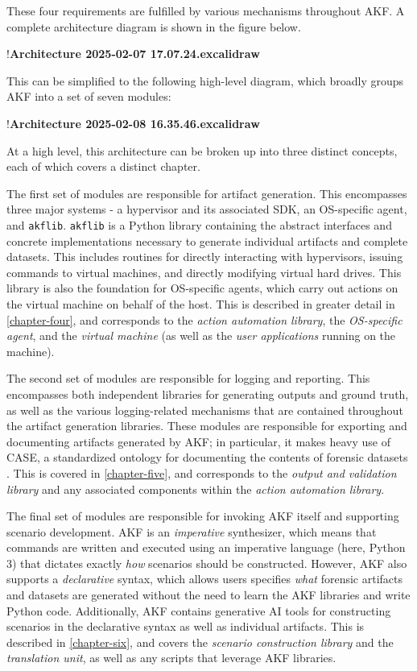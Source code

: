 \documentclass[letterpaper,12pt]{report}
\newcommand{\passthrough}[1]{#1}
\begin{document}
These four requirements are fulfilled by various mechanisms throughout
AKF. A complete architecture diagram is shown in the figure below.

!\textbf{Architecture 2025-02-07 17.07.24.excalidraw}

This can be simplified to the following high-level diagram, which
broadly groups AKF into a set of seven modules:

!\textbf{Architecture 2025-02-08 16.35.46.excalidraw}

At a high level, this architecture can be broken up into three distinct
concepts, each of which covers a distinct chapter.

The first set of modules are responsible for artifact generation. This
encompasses three major systems - a hypervisor and its associated SDK,
an OS-specific agent, and \passthrough{\lstinline!akflib!}.
\passthrough{\lstinline!akflib!} is a Python library containing the
abstract interfaces and concrete implementations necessary to generate
individual artifacts and complete datasets. This includes routines for
directly interacting with hypervisors, issuing commands to virtual
machines, and directly modifying virtual hard drives. This library is
also the foundation for OS-specific agents, which carry out actions on
the virtual machine on behalf of the host. This is described in greater
detail in \autoref{chapter-four}, and corresponds to the
\emph{action automation library}, the \emph{OS-specific agent}, and the
\emph{virtual machine} (as well as the \emph{user applications} running
on the machine).

The second set of modules are responsible for logging and reporting.
This encompasses both independent libraries for generating outputs and
ground truth, as well as the various logging-related mechanisms that are
contained throughout the artifact generation libraries. These modules
are responsible for exporting and documenting artifacts generated by
AKF; in particular, it makes heavy use of CASE, a standardized ontology
for documenting the contents of forensic datasets
\cite{caseyAdvancingCoordinatedCyberinvestigations2017}. This is
covered in \autoref{chapter-five}, and corresponds to the
\emph{output and validation library} and any associated components
within the \emph{action automation library}.

The final set of modules are responsible for invoking AKF itself and
supporting scenario development. AKF is an \emph{imperative}
synthesizer, which means that commands are written and executed using an
imperative language (here, Python 3) that dictates exactly \emph{how}
scenarios should be constructed. However, AKF also supports a
\emph{declarative} syntax, which allows users specifies \emph{what}
forensic artifacts and datasets are generated without the need to learn
the AKF libraries and write Python code. Additionally, AKF contains
generative AI tools for constructing scenarios in the declarative syntax
as well as individual artifacts. This is described in \autoref{chapter-six}, and covers the \emph{scenario construction library}
and the \emph{translation unit}, as well as any scripts that leverage
AKF libraries.
\end{document}
